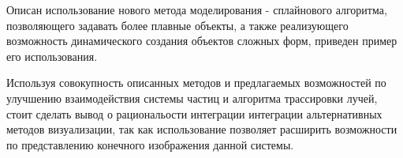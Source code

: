 Описан использование нового метода моделирования - сплайнового алгоритма, позволяющего задавать более плавные объекты, а также реализующего возможность динамического создания объектов сложных форм, приведен пример его использования.

Используя совокупность описанных методов и предлагаемых возможностей по улучшению взаимодействия системы частиц и алгоритма трассировки лучей, стоит сделать вывод о рациональости интеграции интеграции альтернативных методов визуализации, так как использование позволяет расширить возможности по представлению конечного изображения данной системы.